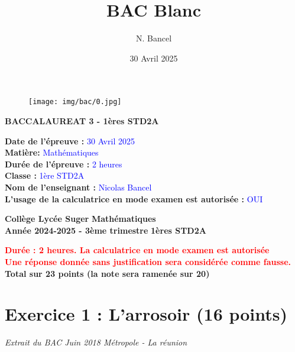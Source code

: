 \documentclass[answers]{exam}
\title{BAC Blanc}
\author{N. Bancel}
\date{30 Avril 2025}
\begin{document}
\begin{figure}[H]
  \centering
  \texttt{[image: img/bac/0.jpg]}
\end{figure}

\vspace{1em}
\vspace{1em}

\textbf{BACCALAUREAT 3 - 1ères STD2A}

\textbf{Date de l'épreuve : } \textcolor{blue}{30 Avril 2025} \\
\textbf{Matière: } \textcolor{blue}{Mathématiques} \\
\textbf{Durée de l'épreuve : } \textcolor{blue}{2 heures} \\
\textbf{Classe : } \textcolor{blue}{1ère STD2A} \\
\textbf{Nom de l'enseignant : } \textcolor{blue}{Nicolas Bancel} \\
\textbf{L'usage de la calculatrice en mode examen est autorisée : } \textcolor{blue}{OUI} \\

\newpage

\textbf{Collège Lycée Suger}
\hfill
\textbf{Mathématiques} \\

\textbf{Année 2024-2025 - 3ème trimestre}
\hfill
\textbf{1ères STD2A} \par

{\let\newpage\relax\maketitle}

\begin{center}
\textbf{\textcolor{red}{Durée : 2 heures. La calculatrice en mode examen est autorisée}} \\
\textbf{\textcolor{red}{Une réponse donnée sans justification sera considérée comme fausse.}} \\
\textbf{Total sur 23 points (la note sera ramenée sur 20)}
\end{center}

\section*{Exercice 1 : L'arrosoir (16 points)}

\textit{Extrait du BAC Juin 2018 Métropole - La réunion}

\vspace{1em}
\end{document}
